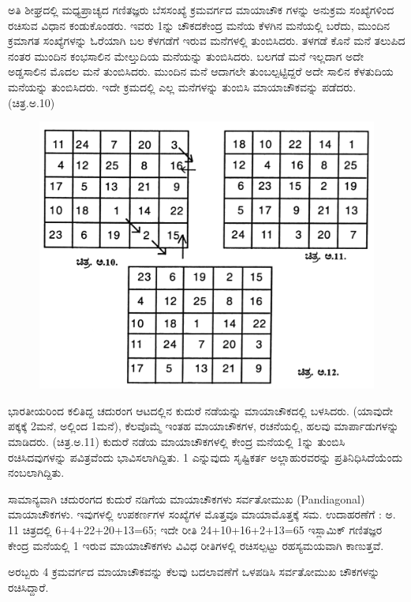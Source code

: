 ಅತಿ ಶೀಘ್ರದಲ್ಲಿ ಮಧ್ಯಪ್ರಾಚ್ಯದ ಗಣಿತಜ್ಞರು ಬೆಸಸಂಖ್ಯೆ ಕ್ರಮವರ್ಗದ ಮಾಯಾಚೌಕ ಗಳನ್ನು ಅನುಕ್ರಮ ಸಂಖ್ಯೆಗಳಿಂದ ರಚಿಸುವ ವಿಧಾನ ಕಂಡುಕೊಂಡರು. ಇವರು 1ನ್ನು ಚೌಕದ\-ಕೇಂದ್ರ ಮನೆಯ ಕೆಳಗಿನ ಮನೆಯಲ್ಲಿ ಬರೆದು, ಮುಂದಿನ ಕ್ರಮಾಗತ ಸಂಖ್ಯೆಗಳನ್ನು ಓರೆಯಾಗಿ ಬಲ ಕೆಳಗಡೆಗೆ ಇರುವ ಮನೆಗಳಲ್ಲಿ ತುಂಬಿಸಿದರು. ತಳಗಡೆ ಕೊನೆ ಮನೆ ತಲುಪಿದ ನಂತರ ಮುಂದಿನ ಕಂಭಸಾಲಿನ ಮೇಲ್ತುದಿಯ ಮನೆಯನ್ನು ತುಂಬಿಸಿದರು. ಬಲಗಡೆ ಮನೆ ಇಲ್ಲದಾಗ ಅದೇ ಅಡ್ಡಸಾಲಿನ ಮೊದಲ ಮನೆ ತುಂಬಿಸಿದರು. ಮುಂದಿನ ಮನೆ ಆದಾಗಲೇ \linebreak ತುಂಬಲ್ಪಟ್ಟಿದ್ದರೆ ಅದೇ ಸಾಲಿನ ಕೆಳತುದಿಯ ಮನೆಯನ್ನು ತುಂಬಿಸಿದರು. ಇದೇ ಕ್ರಮದಲ್ಲಿ ಎಲ್ಲ ಮನೆಗಳನ್ನು ತುಂಬಿಸಿ ಮಾಯಾಚೌಕವನ್ನು ಪಡೆದರು. (ಚಿತ್ರ.ಅ.10)
\begin{figure}[H]
\includegraphics{src/figures/chap9/fig9-8.jpg}
\end{figure}

ಭಾರತೀಯರಿಂದ ಕಲಿತಿದ್ದ ಚದುರಂಗ ಆಟದಲ್ಲಿನ ಕುದುರೆ ನಡೆಯನ್ನು ಮಾಯಾ\-ಚೌಕದಲ್ಲಿ ಬಳಸಿದರು. (ಯಾವುದೇ ಪಕ್ಕಕ್ಕೆ 2ಮನೆ, ಅಲ್ಲಿಂದ 1ಮನೆ), ಕೆಲವೊಮ್ಮೆ ಇಂತಹ ಮಾಯಾ\-ಚೌಕಗಳ, ರಚನೆಯಲ್ಲಿ, ಹಲವು ಮಾರ್ಪಾಡುಗಳನ್ನು ಮಾಡಿದರು. (ಚಿತ್ರ.ಅ.11) ಕುದುರೆ ನಡೆಯ ಮಾಯಾಚೌಕಗಳಲ್ಲಿ ಕೇಂದ್ರ ಮನೆಯಲ್ಲಿ 1ನ್ನು ತುಂಬಿಸಿ ರಚಿಸಿದವುಗಳನ್ನು ಪವಿತ್ರವೆಂದು ಭಾವಿಸಲಾಗಿದ್ದಿತು. 1 ಎನ್ನುವುದು ಸೃಷ್ಟಿಕರ್ತ ಅಲ್ಲಾಹುರವರನ್ನು ಪ್ರತಿನಿಧಿಸಿದೆಯೆಂದು ನಂಬಲಾಗಿದ್ದಿತು.

ಸಾಮಾನ್ಯವಾಗಿ ಚದುರಂಗದ ಕುದುರೆ ನಡಿಗೆಯ ಮಾಯಾಚೌಕಗಳು ಸರ್ವತೋಮುಖ (Pandiagonal) ಮಾಯಾಚೌಕಗಳು. ಇವುಗಳಲ್ಲಿ ಉಪಕರ್ಣಗಳ ಸಂಖ್ಯೆಗಳ ಮೊತ್ತವೂ ಮಾಯಾಮೊತ್ತಕ್ಕೆ ಸಮ. ಉದಾಹರಣೆಗೆ : ಅ. 11 ಚಿತ್ರದಲ್ಲಿ 6+4+22+20+13=65; ಇದೇ ರೀತಿ 24+10+16+2+13=65 ಇಸ್ಲಾಮಿಕ್ ಗಣಿತಜ್ಞರ ಕೇಂದ್ರ ಮನೆಯಲ್ಲಿ 1 ಇರುವ ಮಾಯಾಚೌಕಗಳು ವಿವಿಧ ರೀತಿಗಳಲ್ಲಿ ರಚಿಸಲ್ಪಟ್ಟು ರಹಸ್ಯಮಯವಾಗಿ ಕಾಣುತ್ತವೆ.

ಅರಬ್ಬರು 4 ಕ್ರಮವರ್ಗದ ಮಾಯಾಚೌಕವನ್ನು ಕೆಲವು ಬದಲಾವಣೆಗೆ ಒಳಪಡಿಸಿ ಸರ್ವತೋಮುಖ ಚೌಕಗಳನ್ನು ರಚಿಸಿದ್ದಾರೆ.

